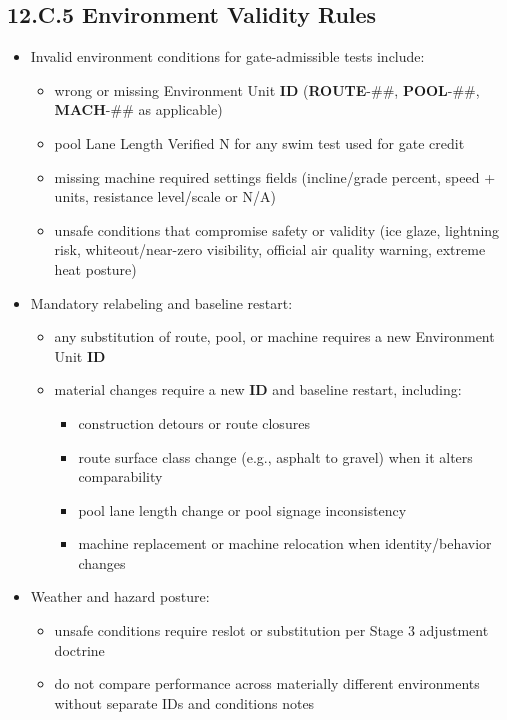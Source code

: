 \documentclass[10pt]{article}
\begin{document}
\begin{landscape}
\newpage
\subsection*{12.C.5 Environment Validity Rules}
{}

\begin{itemize}
\item Invalid environment conditions for gate-admissible tests include:
\begin{itemize}
\item wrong or missing Environment Unit \textbf{ID} (\textbf{ROUTE}-##, \textbf{POOL}-##, \textbf{MACH}-## as applicable)
\item pool Lane Length Verified N for any swim test used for gate credit
\item missing machine required settings fields (incline/grade percent, speed + units, resistance level/scale or N/A)
\item unsafe conditions that compromise safety or validity (ice glaze, lightning risk, whiteout/near-zero visibility, official air quality warning, extreme heat posture)
\end{itemize}
\item Mandatory relabeling and baseline restart:
\begin{itemize}
\item any substitution of route, pool, or machine requires a new Environment Unit \textbf{ID}
\item material changes require a new \textbf{ID} and baseline restart, including:
\begin{itemize}
\item construction detours or route closures
\item route surface class change (e.g., asphalt to gravel) when it alters comparability
\item pool lane length change or pool signage inconsistency
\item machine replacement or machine relocation when identity/behavior changes
\end{itemize}
\end{itemize}
\item Weather and hazard posture:
\begin{itemize}
\item unsafe conditions require reslot or substitution per Stage 3 adjustment doctrine
\item do not compare performance across materially different environments without separate IDs and conditions notes

\end{itemize}
\end{itemize}
\end{landscape}
\end{document}
